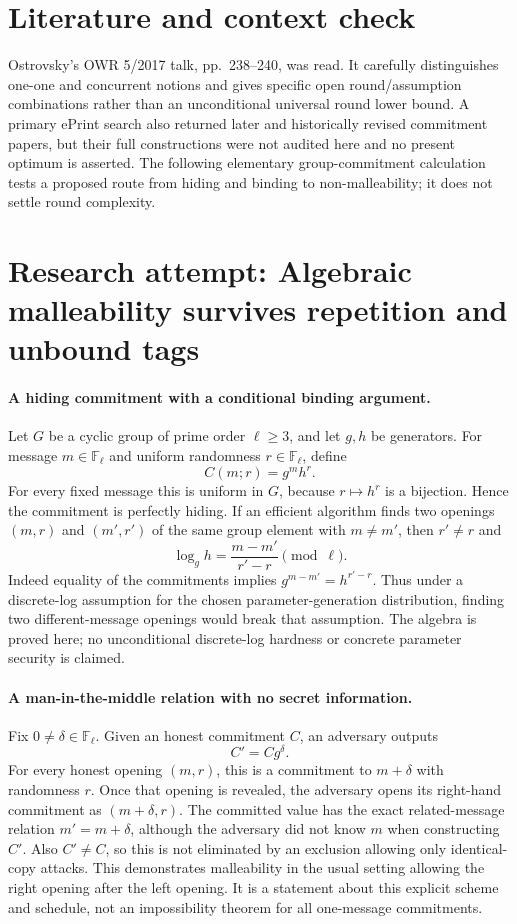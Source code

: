 \documentclass[11pt]{article}
\begin{document}
\section{Literature and context check}
Ostrovsky's OWR 5/2017 talk, pp.~238--240, was read. It carefully distinguishes one-one and concurrent notions and gives specific open round/assumption combinations rather than an unconditional universal round lower bound. A primary ePrint search also returned later and historically revised commitment papers, but their full constructions were not audited here and no present optimum is asserted. The following elementary group-commitment calculation tests a proposed route from hiding and binding to non-malleability; it does not settle round complexity.
\section{Research attempt: Algebraic malleability survives repetition and unbound tags}

\paragraph{A hiding commitment with a conditional binding argument.}
Let $G$ be a cyclic group of prime order $\ell\ge3$, and let $g,h$ be generators. For message $m\in\mathbb F_\ell$ and uniform randomness $r\in\mathbb F_\ell$, define
\[
 C(m;r)=g^m h^r.
\]
For every fixed message this is uniform in $G$, because $r\mapsto h^r$ is a bijection. Hence the commitment is perfectly hiding. If an efficient algorithm finds two openings $(m,r)$ and $(m',r')$ of the same group element with $m\ne m'$, then $r'\ne r$ and
\[
 \log_g h=\frac{m-m'}{r'-r}\pmod\ell.
\]
Indeed equality of the commitments implies $g^{m-m'}=h^{r'-r}$. Thus under a discrete-log assumption for the chosen parameter-generation distribution, finding two different-message openings would break that assumption. The algebra is proved here; no unconditional discrete-log hardness or concrete parameter security is claimed.

\paragraph{A man-in-the-middle relation with no secret information.}
Fix $0\ne\delta\in\mathbb F_\ell$. Given an honest commitment $C$, an adversary outputs
\[
 C'=Cg^\delta.
\]
For every honest opening $(m,r)$, this is a commitment to $m+\delta$ with randomness $r$. Once that opening is revealed, the adversary opens its right-hand commitment as $(m+\delta,r)$. The committed value has the exact related-message relation $m'=m+\delta$, although the adversary did not know $m$ when constructing $C'$. Also $C'\ne C$, so this is not eliminated by an exclusion allowing only identical-copy attacks. This demonstrates malleability in the usual setting allowing the right opening after the left opening. It is a statement about this explicit scheme and schedule, not an impossibility theorem for all one-message commitments.
\end{document}
